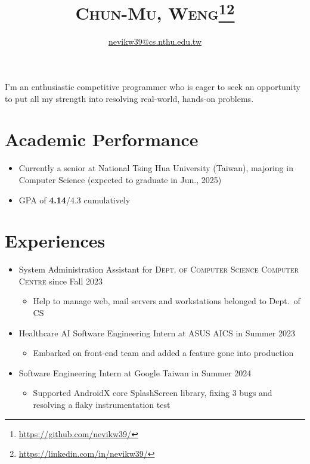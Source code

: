 \documentclass[12pt, a4paper]{article}
\title{\textsc{Chun-Mu, Weng}\footnote{\url{https://github.com/nevikw39/}}\footnote{\url{https://linkedin.com/in/nevikw39/}}}%
\author{\href{mailto:nevikw39@cs.nthu.edu.tw}{\ttfamily nevikw39@cs.nthu.edu.tw}}
\date{}%
\begin{document}
\maketitle

I'm an enthusiastic competitive programmer who is eager to seek an opportunity to put all my strength into resolving real-world, hands-on problems.

\section{Academic Performance}

%

\begin{itemize}
\item Currently a senior at National Tsing Hua University (Taiwan), majoring in \textsf{Computer Science} (expected to graduate in Jun., 2025)
\item GPA of \textbf{4.14}/4.3 cumulatively
\end{itemize}

\section{Experiences}

\begin{itemize}
\item System Administration Assistant for \textsc{Dept. of Computer Science Computer Centre} since Fall 2023
\begin{itemize}
\item Help to manage web, mail servers and workstations belonged to Dept.\ of CS
\end{itemize}
\item Healthcare AI Software Engineering Intern at ASUS AICS in Summer 2023
\begin{itemize}
\item Embarked on front-end team and added a feature gone into production
\end{itemize}
\item Software Engineering Intern at Google Taiwan in Summer 2024
\begin{itemize}
\item Supported \textsf{AndroidX core SplashScreen} library, fixing 3 bugs and resolving a flaky instrumentation test
\end{itemize}
\end{itemize}
\end{document}
